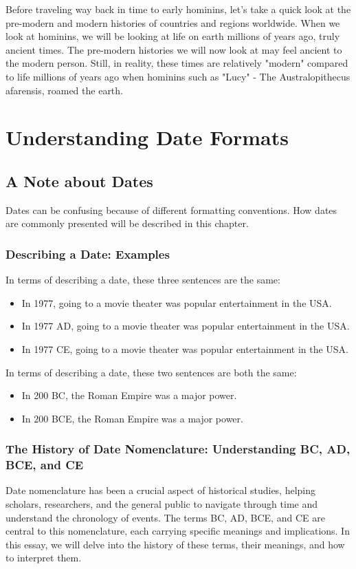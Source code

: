 \documentclass[a4paper,12pt]{book}
\begin{document}
Before traveling way back in time to early hominins, let's take a quick look at the pre-modern and modern histories of countries and regions worldwide. When we look at hominins, we will be looking at life on earth millions of years ago, truly ancient times. The pre-modern histories we will now look at may feel ancient to the modern person. Still, in reality, these times are relatively "modern" compared to life millions of years ago when hominins such as "Lucy" - The Australopithecus afarensis, roamed the earth. 

\chapter{Understanding Date Formats}
\section*{A Note about Dates}
Dates can be confusing because of different formatting conventions. How dates are commonly presented will be described in this chapter.

\subsection*{Describing a Date: Examples}
In terms of describing a date, these three sentences are the same:

\begin{itemize}
    \item In 1977, going to a movie theater was popular entertainment in the USA.
    \item In 1977 AD, going to a movie theater was popular entertainment in the USA.
    \item In 1977 CE, going to a movie theater was popular entertainment in the USA.
\end{itemize}

In terms of describing a date, these two sentences are both the same:

\begin{itemize}
    \item In 200 BC, the Roman Empire was a major power.
    \item In 200 BCE, the Roman Empire was a major power.
\end{itemize}

\subsection*{The History of Date Nomenclature: Understanding BC, AD, BCE, and CE}
Date nomenclature has been a crucial aspect of historical studies, helping scholars, researchers, and the general public to navigate through time and understand the chronology of events. The terms BC, AD, BCE, and CE are central to this nomenclature, each carrying specific meanings and implications. In this essay, we will delve into the history of these terms, their meanings, and how to interpret them.
\end{document}
